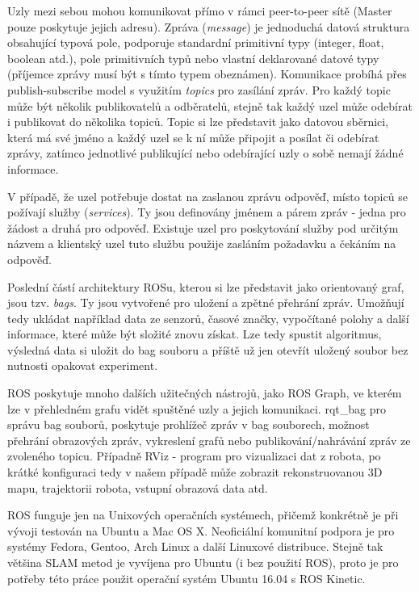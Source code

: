 \documentclass[12pt,a4paper]{article}
\begin{document}
Uzly mezi sebou mohou komunikovat přímo v rámci peer-to-peer sítě (Master pouze poskytuje jejich adresu). Zpráva (\textit{message}) je jednoduchá datová struktura obsahující typová pole, podporuje standardní primitivní typy (integer, float, boolean atd.), pole primitivních typů nebo vlastní deklarované datové typy (příjemce zprávy musí být s tímto typem obeznámen). Komunikace probíhá přes publish-subscribe model s využitím \textit{topics} pro zasílání zpráv. Pro každý topic může být několik publikovatelů a odběratelů, stejně tak každý uzel může odebírat i publikovat do několika topiců. Topic si lze představit jako datovou sběrnici, která má své jméno a každý uzel se k ní může připojit a posílat či odebírat zprávy, zatímco jednotlivé publikující nebo odebírající uzly o sobě nemají žádné informace. 

V případě, že uzel potřebuje dostat na zaslanou zprávu odpověď, místo topiců se požívají služby (\textit{services}). Ty jsou definovány jménem a párem zpráv - jedna pro žádost a druhá pro odpověď. Existuje uzel pro poskytování služby pod určitým názvem a klientský uzel tuto službu použije zasláním požadavku a čekáním na odpověď.

Poslední částí architektury ROSu, kterou si lze představit jako orientovaný graf, jsou tzv. \textit{bags}. Ty jsou vytvořené pro uložení a zpětné přehrání zpráv. Umožňují tedy ukládat například data ze senzorů, časové značky, vypočítané polohy a další informace, které může být složité znovu získat. Lze tedy spustit algoritmus, výsledná data si uložit do bag souboru a příště už jen otevřít uložený soubor bez nutnosti opakovat experiment.

ROS poskytuje mnoho dalších užitečných nástrojů, jako ROS Graph, ve kterém lze v přehledném grafu vidět spuštěné uzly a jejich komunikaci. rqt\_bag pro správu bag souborů, poskytuje prohlížeč zpráv v bag souborech, možnost přehrání obrazových zpráv, vykreslení grafů nebo publikování/nahrávání zpráv ze zvoleného topicu. Případně RViz - program pro vizualizaci dat z robota, po krátké konfiguraci tedy v našem případě může zobrazit rekonstruovanou 3D mapu, trajektorii robota, vstupní obrazová data atd.

ROS funguje jen na Unixových operačních systémech, přičemž konkrétně je při vývoji testován na Ubuntu a Mac OS X. Neoficiální komunitní podpora je pro systémy Fedora, Gentoo, Arch Linux a další Linuxové distribuce. Stejně tak většina SLAM metod je vyvíjena pro Ubuntu (i bez použití ROS), proto je pro potřeby této práce použit operační systém Ubuntu 16.04 s ROS Kinetic.
\end{document}
